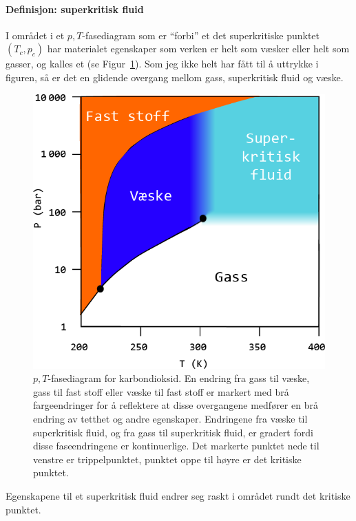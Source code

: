 \paragraph{Definisjon: superkritisk fluid} I området i et $p,T$-fasediagram som er ``forbi'' et det superkritiske punktet $(T_c,p_c)$ har materialet egenskaper som verken er helt som væsker eller helt som gasser, og kalles et  (se Figur~\ref{fig:carbondioxide}). Som jeg ikke helt har fått til å uttrykke i figuren, så er det en glidende overgang mellom gass, superkritisk fluid og væske. 
\begin{figure}[H]
	\bmd\centering
	\includegraphics[width=0.9\linewidth]{carbondioxide.png}
	\caption{$p,T$-fasediagram for karbondioksid. En endring fra gass til væske, gass til fast stoff eller væske til fast stoff er markert med brå fargeendringer for å reflektere at disse overgangene medfører en brå endring av tetthet og andre egenskaper. Endringene fra væske til superkritisk fluid, og fra gass til superkritisk fluid, er gradert fordi disse faseendringene er kontinuerlige. Det markerte punktet nede til venstre er trippelpunktet, punktet oppe til høyre er det kritiske punktet.}
	\label{fig:carbondioxide}
\emd\end{figure}

Egenskapene til et superkritisk fluid endrer seg raskt i området rundt det kritiske punktet.

